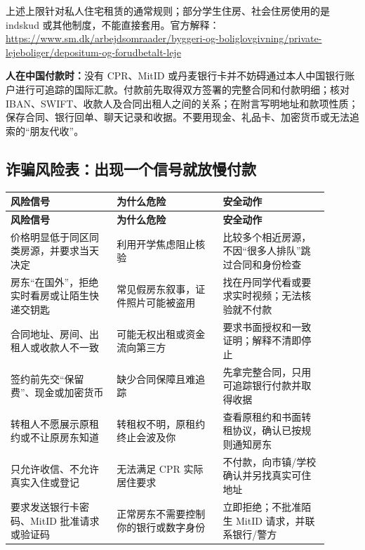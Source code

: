上述上限针对私人住宅租赁的通常规则；部分学生住房、社会住房使用的是 indskud 或其他制度，不能直接套用。官方解释：\url{https://www.sm.dk/arbejdsomraader/byggeri-og-boliglovgivning/private-lejeboliger/depositum-og-forudbetalt-leje}

\begin{grayleftbox}
\textbf{人在中国付款时：}没有 CPR、MitID 或丹麦银行卡并不妨碍通过本人中国银行账户进行可追踪的国际汇款。付款前先取得双方签署的完整合同和付款明细；核对 IBAN、SWIFT、收款人及合同出租人之间的关系；在附言写明地址和款项性质；保存合同、银行回单、聊天记录和收据。不要用现金、礼品卡、加密货币或无法追索的“朋友代收”。
\end{grayleftbox}

\subsection{诈骗风险表：出现一个信号就放慢付款}

\small
{}
\begin{longtable}{p{0.30\linewidth}p{0.30\linewidth}p{0.30\linewidth}}
  \toprule
  \textbf{风险信号} & \textbf{为什么危险} & \textbf{安全动作} \\
  \midrule
  \endfirsthead
  \toprule
  \textbf{风险信号} & \textbf{为什么危险} & \textbf{安全动作} \\
  \midrule
  \endhead
  \bottomrule
  \endfoot
  价格明显低于同区同类房源，并要求当天决定 & 利用开学焦虑阻止核验 & 比较多个相近房源，不因“很多人排队”跳过合同和身份检查 \\
  房东“在国外”，拒绝实时看房或让陌生快递交钥匙 & 常见假房东叙事，证件照片可能被盗用 & 找在丹同学代看或要求实时视频；无法核验就不付款 \\
  合同地址、房间、出租人或收款人不一致 & 可能无权出租或资金流向第三方 & 要求书面授权和一致证明；解释不清即停止 \\
  签约前先交“保留费”、现金或加密货币 & 缺少合同保障且难追踪 & 先拿完整合同，只用可追踪银行付款并取得收据 \\
  转租人不愿展示原租约或不让原房东知道 & 转租权不明，原租约终止会波及你 & 查看原租约和书面转租协议，确认已按规则通知房东 \\
  只允许收信、不允许真实入住或登记 & 无法满足 CPR 实际居住要求 & 不付款，向市镇/学校确认并另找真实可住地址 \\
  要求发送银行卡密码、MitID 批准请求或验证码 & 正常房东不需要控制你的银行或数字身份 & 立即拒绝；不批准陌生 MitID 请求，并联系银行/警方 \\
\end{longtable}
\normalsize

